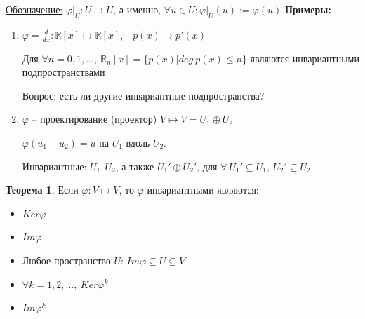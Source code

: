\documentclass[a4paper, 12pt]{article}
\theoremstyle{definition}
\newtheorem*{theorem}{Теорема}
\begin{document}
    \underline{Обозначение:} $\varphi|_U: U \longmapsto U$, а именно,
    $\forall u \in U: \varphi|_U(u) := \varphi(u)$
    \newpage
    \textbf{Примеры:}
    \begin{enumerate}
        \item $\varphi = \frac{d}{dx}: \mathbb{R}[x]
        \longmapsto \mathbb{R}[x]$,\ \ $p(x) \longmapsto p'(x)$
        
        Для $\forall n = 0,1,...,\ \mathbb{R}_n[x] = \{p(x)|
        deg\ p(x)\leq n\}$ являются инвариантными подпространствами

        Вопрос: есть ли другие инвариантные подпространства?
        \item $\varphi$ -- проектирование (проектор) $V
        \longmapsto V = U_1 \oplus U_2$
        
        $\varphi(u_1 + u_2) = u$ на $U_1$ вдоль $U_2$.
        
        Инвариантные: $U_1, U_2$, а также $U_1' \oplus U_2'$,
        для $\forall\ U_1' \subseteq U_1,\ U_2' \subseteq U_2$.
    \end{enumerate}
    
    \begin{theorem}
        Если $\varphi: V \longmapsto  V$, то $\varphi$-инвариантными
        являются:
        \begin{itemize}
            \item $Ker \varphi$
            \item $Im \varphi$
            \item Любое пространство $U$: $Im \varphi \subseteq 
            U \subseteq V$
            \item $\forall k = 1,2,...,\ Ker \varphi^k$
            \item $Im \varphi^k$ 
        \end{itemize}
    \end{theorem}
\end{document}
